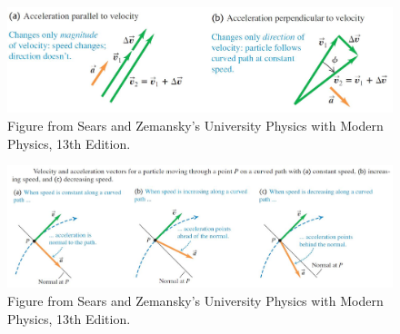 \documentclass[]{beamer}
\begin{document}
\begin{frame}

  

   

 
        \begin{figure}[h!]  
            \includegraphics[width=1.\textwidth]{images/12.jpg}
             \caption{ {\tiny Figure from Sears and Zemansky's University Physics 
             with Modern Physics, 13th Edition.} }
          \end{figure}

\end{frame}






\begin{frame}

  

   

 
    \begin{figure}[h!]  
        \includegraphics[width=1.2\textwidth]{images/13.jpg}
         \caption{ {\tiny Figure from Sears and Zemansky's University Physics 
         with Modern Physics, 13th Edition.} }
      \end{figure}

\end{frame}





\end{document}

